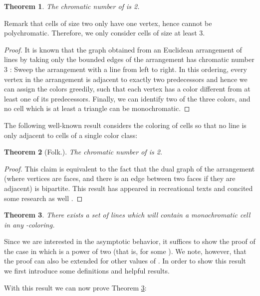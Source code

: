 \documentclass[11pt,a4paper]{article}
\newtheorem{theorem}{Theorem}
\begin{document}
\begin{theorem}\label{tight:chromvertex}
The chromatic number of  is 2.
\end{theorem}
\noindent Remark that cells of size two only have one vertex, hence cannot be polychromatic. Therefore,  we only consider cells of size at least 3.
\begin{proof}
It is known that the graph obtained from an Euclidean arrangement of lines by taking only the
bounded edges of the arrangement has chromatic number 3 \cite{FHNS}: Sweep the arrangement with a line from left to right. In this ordering, every vertex in the arrangement is adjacent to exactly two predecessors and hence we can assign the colors greedily, such that each vertex has a color different from at least one of its predecessors.
Finally, we can identify two of the three colors, and no cell which is at least a triangle can be monochromatic.
\end{proof}

The following well-known result considers the coloring of cells so that no line is only adjacent to cells of a single color class:

\begin{theorem}[Folk.]\label{tight:chromcells}
The chromatic number of  is 2.
\end{theorem}
\begin{proof}
This claim is equivalent to the fact that the dual graph of the arrangement (where vertices are 
faces, and there is an edge between two faces if they are adjacent) is bipartite. This result
has appeared in recreational texts and concited some research as well \cite{L1894,Gru5}.
\end{proof}



\iffalse
\begin{theorem}\label{LB:chrom}
There exists a set  of  lines which will contain a monochromatic cell in any -coloring.
\end{theorem}
Since we are interested in the asymptotic behavior, it suffices to show the proof of the case in which  is a power of two (that is,  for some ). We note, however, that the proof can also be extended for other values of . In order to show this result we first introduce some definitions and helpful results.

With this result we can now prove Theorem \ref{LB:chrom}:
\end{document}
